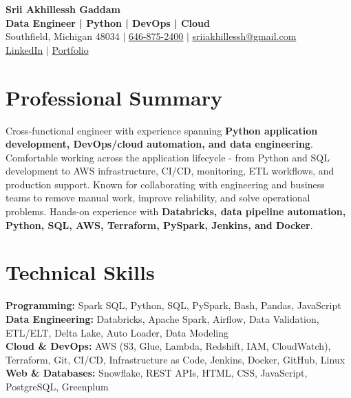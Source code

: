 \documentclass[letterpaper,10pt]{article}
\begin{document}
\fontsize{9.35pt}{10.45pt}\selectfont

\begin{center}
    {\LARGE \textbf{Srii Akhillessh Gaddam}} \\[-1pt]
    \textbf{Data Engineer | Python | DevOps | Cloud} \\[2pt]
    Southfield, Michigan 48034 $|$
    \href{tel:6468752400}{646-875-2400} $|$
    \href{mailto:sriiakhillessh@gmail.com}{sriiakhillessh@gmail.com} \\[1pt]
    \href{https://www.linkedin.com/in/srii-akhiilessh-gaddam-b48668191/}{LinkedIn} $|$
    \href{https://sriiakhillesshg.github.io/portfolio/}{Portfolio}
\end{center}
\vspace{-8pt}

\section{Professional Summary}
\small{Cross-functional engineer with experience spanning \textbf{Python application development, DevOps/cloud automation, and data engineering}. Comfortable working across the application lifecycle - from Python and SQL development to AWS infrastructure, CI/CD, monitoring, ETL workflows, and production support. Known for collaborating with engineering and business teams to remove manual work, improve reliability, and solve operational problems. Hands-on experience with \textbf{Databricks, data pipeline automation, Python, SQL, AWS, Terraform, PySpark, Jenkins, and Docker}.}

\section{Technical Skills}
\small{
\textbf{Programming:} Spark SQL, Python, SQL, PySpark, Bash, Pandas, JavaScript \\
\textbf{Data Engineering:} Databricks, Apache Spark, Airflow, Data Validation, ETL/ELT, Delta Lake, Auto Loader, Data Modeling \\
\textbf{Cloud \& DevOps:} AWS (S3, Glue, Lambda, Redshift, IAM, CloudWatch), Terraform, Git, CI/CD, Infrastructure as Code, Jenkins, Docker, GitHub, Linux \\
\textbf{Web \& Databases:} Snowflake, REST APIs, HTML, CSS, JavaScript, PostgreSQL, Greenplum
}
\end{document}
